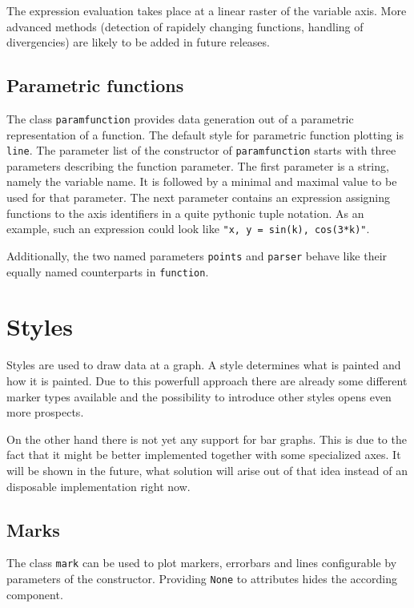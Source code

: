 The expression evaluation takes place at a linear raster of the
variable axis. More advanced methods (detection of rapidely changing
functions, handling of divergencies) are likely to be added in future
releases.

\subsection{Parametric functions}

The class \verb|paramfunction| provides data generation out of a
parametric representation of a function. The default style for
parametric function plotting is \verb|line|. The parameter list of the
constructor of \verb|paramfunction| starts with three parameters
describing the function parameter. The first parameter is a string,
namely the variable name. It is followed by a minimal and maximal
value to be used for that parameter. The next parameter contains an
expression assigning functions to the axis identifiers in a quite
pythonic tuple notation. As an example, such an expression could look
like \verb|"x, y = sin(k), cos(3*k)"|.

Additionally, the two named parameters \verb|points| and \verb|parser|
behave like their equally named counterparts in \verb|function|.

\section{Styles}
\label{graph:styles}

Styles are used to draw data at a graph. A style determines what is
painted and how it is painted. Due to this powerfull approach there
are already some different marker types available and the possibility
to introduce other styles opens even more prospects.

On the other hand there is not yet any support for bar graphs. This is
due to the fact that it might be better implemented together with some
specialized axes. It will be shown in the future, what solution will
arise out of that idea instead of an disposable implementation right
now.

\subsection{Marks}

The class \verb|mark| can be used to plot markers, errorbars and lines
configurable by parameters of the constructor. Providing \verb|None|
to attributes hides the according component.

